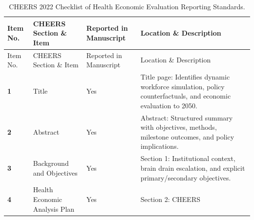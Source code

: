 \documentclass[
  11pt,
  a4paper]{article}
\begin{document}
\begin{longtable}[]{@{}
  >{\centering\arraybackslash}p{}
  >{\raggedright\arraybackslash}p{}
  >{\centering\arraybackslash}p{}
  >{\raggedright\arraybackslash}p{}@{}}
\caption{CHEERS 2022 Checklist of Health Economic Evaluation Reporting
Standards.}\label{tbl-app-cheers}\tabularnewline
\toprule\noalign{}
\begin{minipage}[b]{\linewidth}\centering
Item No.
\end{minipage} & \begin{minipage}[b]{\linewidth}\raggedright
CHEERS Section \& Item
\end{minipage} & \begin{minipage}[b]{\linewidth}\centering
Reported in Manuscript
\end{minipage} & \begin{minipage}[b]{\linewidth}\raggedright
Location \& Description
\end{minipage} \\
\midrule\noalign{}
\endfirsthead
\toprule\noalign{}
\begin{minipage}[b]{\linewidth}\centering
Item No.
\end{minipage} & \begin{minipage}[b]{\linewidth}\raggedright
CHEERS Section \& Item
\end{minipage} & \begin{minipage}[b]{\linewidth}\centering
Reported in Manuscript
\end{minipage} & \begin{minipage}[b]{\linewidth}\raggedright
Location \& Description
\end{minipage} \\
\midrule\noalign{}
\endhead
\bottomrule\noalign{}
\endlastfoot
\textbf{1} & Title & Yes & Title page: Identifies dynamic workforce
simulation, policy counterfactuals, and economic evaluation to 2050. \\
\textbf{2} & Abstract & Yes & Abstract: Structured summary with
objectives, methods, milestone outcomes, and policy implications. \\
\textbf{3} & Background and Objectives & Yes & Section 1: Institutional
context, brain drain escalation, and explicit primary/secondary
objectives. \\
\textbf{4} & Health Economic Analysis Plan & Yes & Section 2: CHEERS

\end{longtable}
\end{document}
